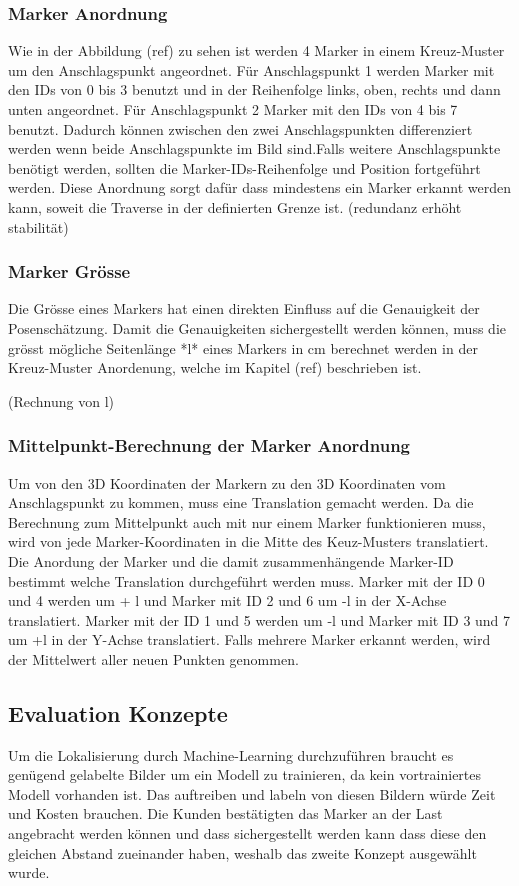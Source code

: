 \subsubsection{Marker Anordnung}

Wie in der Abbildung (ref) zu sehen ist werden 4 Marker in einem Kreuz-Muster um den Anschlagspunkt angeordnet. Für Anschlagspunkt 1 werden Marker mit den IDs von 0 bis 3 benutzt und in der Reihenfolge links, oben, rechts und dann unten angeordnet. Für Anschlagspunkt 2 Marker mit den IDs von 4 bis 7 benutzt. Dadurch können zwischen den zwei Anschlagspunkten differenziert werden wenn beide Anschlagspunkte im Bild sind.Falls weitere Anschlagspunkte benötigt werden, sollten die Marker-IDs-Reihenfolge und Position fortgeführt werden. Diese Anordnung sorgt dafür dass mindestens ein Marker erkannt werden kann, soweit die Traverse in der definierten Grenze ist. 
(redundanz erhöht stabilität)

\subsubsection{Marker Grösse}

Die Grösse eines Markers hat einen direkten Einfluss auf die Genauigkeit der Posenschätzung. Damit die Genauigkeiten sichergestellt werden können, muss die grösst mögliche Seitenlänge *l* eines Markers in cm berechnet werden in der Kreuz-Muster Anordenung, welche im Kapitel (ref) beschrieben ist.

(Rechnung von l)


\subsubsection{Mittelpunkt-Berechnung der Marker Anordnung}

Um von den 3D Koordinaten der Markern zu den 3D Koordinaten vom Anschlagspunkt zu kommen, muss eine Translation gemacht werden. Da die Berechnung zum Mittelpunkt auch mit nur einem Marker funktionieren muss, wird von jede Marker-Koordinaten in die Mitte des Keuz-Musters translatiert. Die Anordung der Marker und die damit zusammenhängende Marker-ID bestimmt welche Translation durchgeführt werden muss. Marker mit der ID 0 und 4 werden um + l und Marker mit ID 2 und 6 um -l in der X-Achse translatiert. Marker mit der ID 1 und 5 werden um -l und Marker mit ID 3 und 7 um +l in der Y-Achse translatiert. Falls mehrere Marker erkannt werden, wird der Mittelwert aller neuen Punkten genommen.

\subsection{Evaluation Konzepte}
Um die Lokalisierung durch Machine-Learning durchzuführen braucht es genügend gelabelte Bilder um ein Modell zu trainieren, da kein vortrainiertes Modell vorhanden ist. Das auftreiben und labeln von diesen Bildern würde Zeit und Kosten brauchen. Die Kunden bestätigten das Marker an der Last angebracht werden können und dass sichergestellt werden kann dass diese den gleichen Abstand zueinander haben, weshalb das zweite Konzept ausgewählt wurde.

